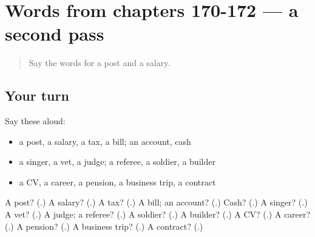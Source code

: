 \section[(dialogue)]{Words from chapters 170-172 — a second pass}

\label{lesson:RU-R172-second-pass-words-from-chapters-170-172}



\begin{quote}
Say the words for a post and a salary.
\end{quote}

\subsection*{Your turn}
Say these aloud:

\begin{itemize}
\raggedright
  \item a post, a salary, a tax, a bill; an account, cash
  \item a singer, a vet, a judge; a referee, a soldier, a builder
  \item a CV, a career, a pension, a business trip, a contract
\end{itemize}

\begin{tcolorbox}[breakable,colback=teal!4,colframe=teal!35!black,title={Before you move on}]
A post? (\textbf{}.) A salary? (\textbf{}.) A tax? (\textbf{}.) A bill; an account? (\textbf{}.) Cash? (\textbf{}.) A singer? (\textbf{}.) A vet? (\textbf{}.) A judge; a referee? (\textbf{}.) A soldier? (\textbf{}.) A builder? (\textbf{}.) A CV? (\textbf{}.) A career? (\textbf{}.) A pension? (\textbf{}.) A business trip? (\textbf{}.) A contract? (\textbf{}.)
\end{tcolorbox}
